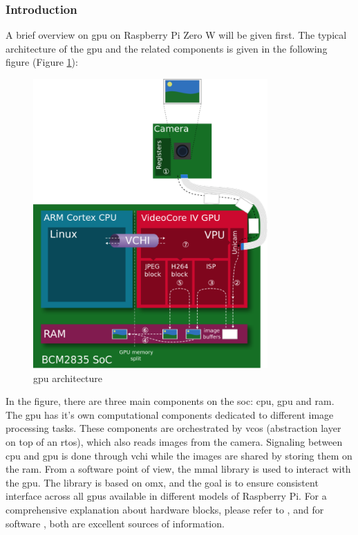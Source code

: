 \subsubsection{Introduction}
A brief overview on \ac{gpu} on Raspberry Pi Zero W will be given first. The typical architecture of the \ac{gpu} and the related components is given in the following figure (Figure \ref{fig:physical:gpu_architecture}):
 
 \begin{figure}[H]
    \centering
    \includegraphics[width=0.8\textwidth]{physical/figures/gpu_architecture}
    \caption{\ac{gpu} architecture \cite{jones_videocore_nodate-1}}
    \label{fig:physical:gpu_architecture}
\end{figure}

In the figure, there are three main components on the \ac{soc}: \ac{cpu}, \ac{gpu} and \ac{ram}.
The \ac{gpu} has it's own computational components dedicated to different image processing tasks.
These components are orchestrated by \ac{vcos} (abstraction layer on top of an \ac{rtos}), which also reads images from the camera.
Signaling between \ac{cpu} and \ac{gpu} is done through \ac{vchi} while the images are shared by storing them on the \ac{ram}.
From a software point of view, the \ac{mmal} library is used to interact with the \ac{gpu}.
The library is based on \ac{omx}, and the goal is to ensure consistent interface across all \acp{gpu} available in different models of Raspberry Pi.
For a comprehensive explanation about hardware blocks, please refer to \cite{jones_videocore_nodate-1}, and for software \cite{jones_videocore_nodate}, both are excellent sources of information.

